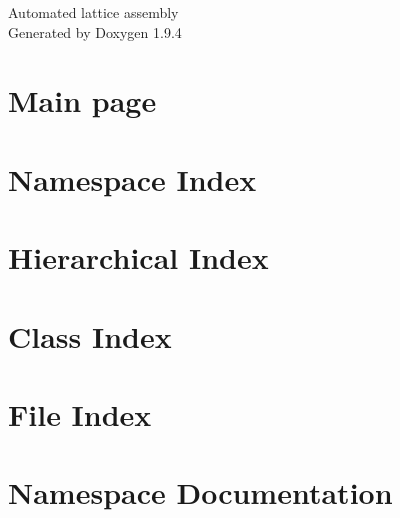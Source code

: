 \documentclass[twoside]{book}
\newcommand{\+}{\discretionary{\mbox{\scriptsize$\hookleftarrow$}}{}{}}
\newcommand{\clearemptydoublepage}{%
    \newpage{\pagestyle{empty}\cleardoublepage}%
  }
\begin{document}
  \raggedbottom
    \hypersetup{pageanchor=false,
                bookmarksnumbered=true,
                pdfencoding=unicode
               }
  \begin{titlepage}
  \vspace*{7cm}
  \begin{center}%
  {\Large Automated lattice assembly}\\
  \vspace*{1cm}
  {\large Generated by Doxygen 1.9.4}\\
  \end{center}
  \end{titlepage}
  \clearemptydoublepage
  \tableofcontents
  \clearemptydoublepage
  \hypersetup{pageanchor=true}
\chapter{Main page}
\label{index}\hypertarget{index}{}
\chapter{Namespace Index}

\chapter{Hierarchical Index}

\chapter{Class Index}

\chapter{File Index}

\chapter{Namespace Documentation}





\end{document}
